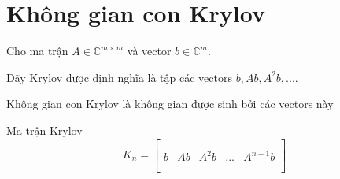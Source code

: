 \section*{Không gian con Krylov}
Cho ma trận $A \in \mathbb{C}^{m \times m}$ và vector $b \in \mathbb{C}^m$.

Dãy Krylov được định nghĩa là tập các vectors $b, Ab, A^2b, ...$.

Không gian con Krylov là không gian được sinh bởi các vectors này

Ma trận Krylov
\begin{equation}
    K_n = \left[
        \begin{array}{c|c|c|c|c}
        &  &  &  \\
        &  &  &  \\
        b & Ab &  A^2b & ... &  A^{n-1}b \\
        &  &  &  \\
        &  &  &  
        \end{array}
    \right]
\end{equation}
